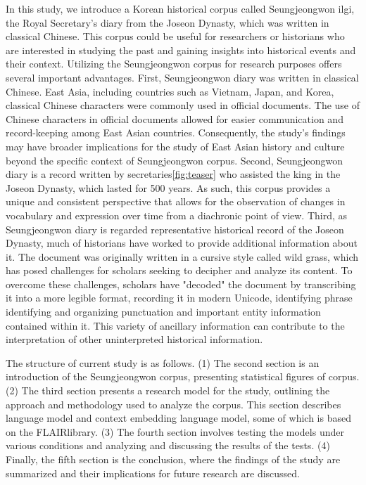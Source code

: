 \documentclass[sigconf]{acmart}
\begin{document}
In this study, we introduce a Korean historical corpus called Seungjeongwon ilgi, the Royal Secretary's diary from the Joseon Dynasty, which was written in classical Chinese. This corpus could be useful for researchers or historians who are interested in studying the past and gaining insights into historical events and their context.
Utilizing the Seungjeongwon corpus for research purposes offers several important advantages. First, Seungjeongwon diary was written in classical Chinese. East Asia, including countries such as Vietnam, Japan, and Korea, classical Chinese characters were commonly used in official documents. The use of Chinese characters in official documents allowed for easier communication and record-keeping among East Asian countries. Consequently, the study's findings may have broader implications for the study of East Asian history and culture beyond the specific context of Seungjeongwon corpus. Second, Seungjeongwon diary is a record written by secretaries\ref{fig:teaser} who assisted the king in the Joseon Dynasty, which lasted for 500 years. As such, this corpus provides a unique and consistent perspective that allows for the observation of changes in vocabulary and expression over time from a diachronic point of view. Third, as Seungjeongwon diary is regarded representative historical record of the Joseon Dynasty, much of historians have worked to provide additional information about it. The document was originally written in a cursive style called wild grass, which has posed challenges for scholars seeking to decipher and analyze its content. To overcome these challenges, scholars have "decoded" the document by transcribing it into a more legible format, recording it in modern Unicode, identifying phrase identifying and organizing punctuation and important entity information contained within it. This variety of ancillary information can contribute to the interpretation of other uninterpreted historical information.

The structure of current study is as follows. (1) The second section is an introduction of the Seungjeongwon corpus, presenting statistical figures of corpus. (2) The third section presents a research model for the study, outlining the approach and methodology used to analyze the corpus. This section describes language model and context embedding language model, some of which is based on the FLAIR\cite{ref_article4}\cite{ref_proc5}library. (3) The fourth section involves testing the models under various conditions and analyzing and discussing the results of the tests. (4) Finally, the fifth section is the conclusion, where the findings of the study are summarized and their implications for future research are discussed.
\end{document}
